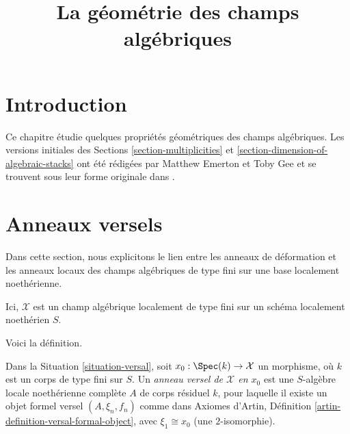 

%


\title{La géométrie des champs algébriques}


\maketitle

\label{section-phantom}

\tableofcontents

\section{Introduction}
\label{section-introduction}

\noindent
Ce chapitre étudie quelques propriétés géométriques des champs algébriques.
Les versions initiales des Sections \ref{section-multiplicities} et
\ref{section-dimension-of-algebraic-stacks}
ont été rédigées par Matthew Emerton et Toby Gee et se trouvent
sous leur forme originale dans \cite{Emerton-Gee-dim}.







\section{Anneaux versels}
\label{section-versal}

\noindent
Dans cette section, nous explicitons le lien entre les anneaux de déformation
et les anneaux locaux des champs algébriques de type fini sur une base
localement noethérienne.

\begin{situation}
\label{situation-versal}
Ici, $\mathcal{X}$ est un champ algébrique localement de type fini
sur un schéma localement noethérien $S$.
\end{situation}

\noindent
Voici la définition.

\begin{definition}
\label{definition-versal-ring-at-x}
Dans la Situation \ref{situation-versal}, soit $x_0 : \Spec(k) \to \mathcal{X}$
un morphisme, où $k$ est un corps de type fini sur $S$.
Un {\it anneau versel de $\mathcal{X}$ en $x_0$} est
une $S$-algèbre locale noethérienne complète $A$ de corps résiduel $k$,
pour laquelle il existe un objet formel versel
$(A, \xi_n, f_n)$ comme dans Axiomes d'Artin, Définition
\ref{artin-definition-versal-formal-object},
avec $\xi_1 \cong x_0$ (une $2$-isomorphie).
\end{definition}

